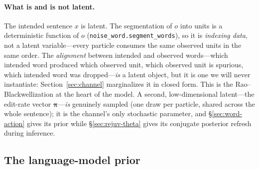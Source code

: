 \documentclass[11pt]{article}
\providecommand{\code}[1]{\texttt{#1}}
\providecommand{\actdist}{\bm{\pi}}            %
\begin{document}
\paragraph{What is and is not latent.} The intended sentence $x$ is latent. The segmentation of $o$ into units is a deterministic function of $o$ (\code{noise\_word.segment\_words}), so it is \emph{indexing data}, not a latent variable---every particle consumes the same observed units in the same order. The \emph{alignment} between intended and observed words---which intended word produced which observed unit, which observed unit is spurious, which intended word was dropped---\emph{is} a latent object, but it is one we will never instantiate: Section~\ref{sec:channel} marginalizes it in closed form. This is the Rao--Blackwellization at the heart of the model. A second, low-dimensional latent---the edit-rate vector $\actdist$---\emph{is} genuinely sampled (one draw per particle, shared across the whole sentence); it is the channel's only stochastic parameter, and \S\ref{sec:word-action} gives its prior while \S\ref{sec:rejuv-theta} gives its conjugate posterior refresh during inference.

\subsection{The language-model prior}
\label{sec:lm}
\end{document}
